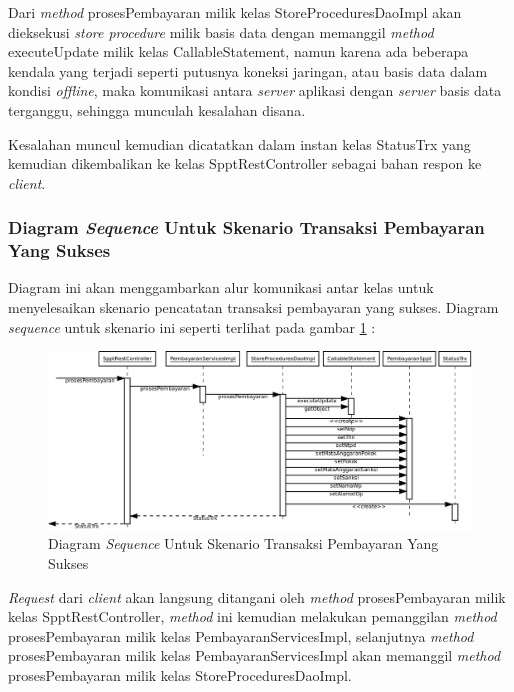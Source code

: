 \documentclass[pdftex,12pt, oneside]{article}
\begin{document}
Dari \textit{method} prosesPembayaran milik kelas StoreProceduresDaoImpl akan dieksekusi \textit{store procedure} milik basis data dengan memanggil \textit{method} executeUpdate milik kelas CallableStatement, namun karena ada beberapa kendala yang terjadi seperti putusnya koneksi jaringan, atau basis data dalam kondisi \textit{offline}, maka komunikasi antara \textit{server} aplikasi dengan \textit{server} basis data terganggu, sehingga munculah kesalahan disana.

Kesalahan muncul kemudian dicatatkan dalam instan kelas StatusTrx yang kemudian dikembalikan ke kelas SpptRestController sebagai bahan respon ke \textit{client}.

\subsubsection{Diagram \textit{Sequence} Untuk Skenario Transaksi Pembayaran Yang Sukses}

Diagram ini akan menggambarkan alur komunikasi antar kelas untuk menyelesaikan skenario pencatatan transaksi pembayaran yang sukses. Diagram \textit{sequence} untuk skenario ini seperti terlihat pada gambar \ref{fig:uml-seq-trx} :

\begin{figure}[H]
  \centering
  \includegraphics[width=1\textwidth]{./resources/uml/uml-seq-trx}
  \caption{Diagram \textit{Sequence} Untuk Skenario Transaksi Pembayaran Yang Sukses}
  \label{fig:uml-seq-trx}
\end{figure}

\textit{Request} dari \textit{client} akan langsung ditangani oleh \textit{method} prosesPembayaran milik kelas SpptRestController, \textit{method} ini kemudian melakukan pemanggilan \textit{method} prosesPembayaran milik kelas PembayaranServicesImpl, selanjutnya \textit{method} prosesPembayaran milik kelas PembayaranServicesImpl akan memanggil \textit{method} prosesPembayaran milik kelas StoreProceduresDaoImpl.
\end{document}
